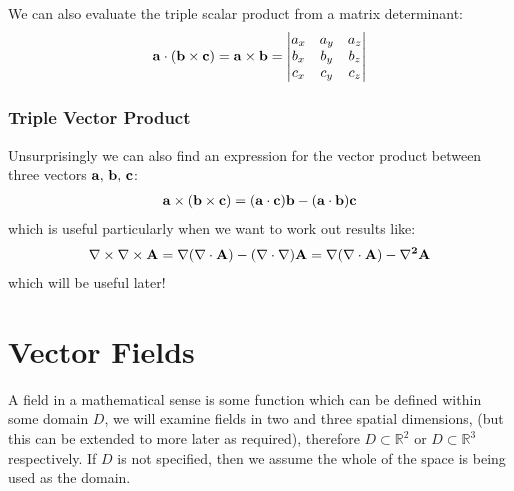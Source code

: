 \documentclass[letterpaper,10pt,english]{jupyterBook}
\begin{document}
\sphinxAtStartPar
We can also evaluate the triple scalar product from a matrix determinant:
\begin{equation*}
\begin{split} {\bf a \cdot (b \times c)} = \mathbf{a}\times\mathbf{b} = \begin{vmatrix}
 a_x & a_y & a_z \\
 b_x & b_y & b_z \\
 c_x & c_y & c_z \\
\end{vmatrix}\end{split}
\end{equation*}

\subsection{Triple Vector Product}
\label{\detokenize{VectorCalculus/vectoralgebra:triple-vector-product}}
\sphinxAtStartPar
Unsurprisingly we can also find an expression for the vector product between three vectors \(\bf a, \,b,\,c\):
\begin{equation*}
\begin{split}\bf a \times (b \times c) = (a\cdot c)b - (a \cdot b)c\end{split}
\end{equation*}
\sphinxAtStartPar
which is useful particularly when we want to work out results like:
\begin{equation*}
\begin{split}\bf \nabla \times \nabla \times A = \nabla(\nabla \cdot A) - (\nabla\cdot \nabla)A = \nabla(\nabla \cdot A) - \nabla^2 A\end{split}
\end{equation*}
\sphinxAtStartPar
which will be useful later!


\chapter{Vector Fields}
\label{\detokenize{VectorCalculus/calculusonfields:vector-fields}}\label{\detokenize{VectorCalculus/calculusonfields::doc}}
\sphinxAtStartPar
A field in a mathematical sense is some function which can be defined within some domain \(D\), we will examine fields in two and three spatial dimensions,
(but this can be extended to more later as required), therefore \(D \subset \mathbb{R}^2\) or \(D \subset \mathbb{R}^3\) respectively.  If \(D\) is not specified, then
we assume the whole of the space is being used as the domain.
\end{document}
